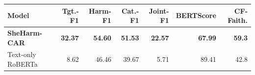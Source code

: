 \begin{tabular}{lrrrrrr}
\toprule
\textbf{Model} & \textbf{Tgt.-F1} & \textbf{Harm-F1} & \textbf{Cat.-F1} & \textbf{Joint-F1} & \textbf{BERTScore} & \textbf{CF-Faith.} \\
\midrule
\textbf{SheHarm-CAR} & \textbf{32.37} & \textbf{54.60} & \textbf{51.53} & \textbf{22.57} & \textbf{67.99} & \textbf{59.3} \\
Text-only RoBERTa \citep{liu2019roberta} & 8.62 & 46.46 & 39.67 & 5.71 & 89.41 & 42.8 \\
\bottomrule
\end{tabular}
